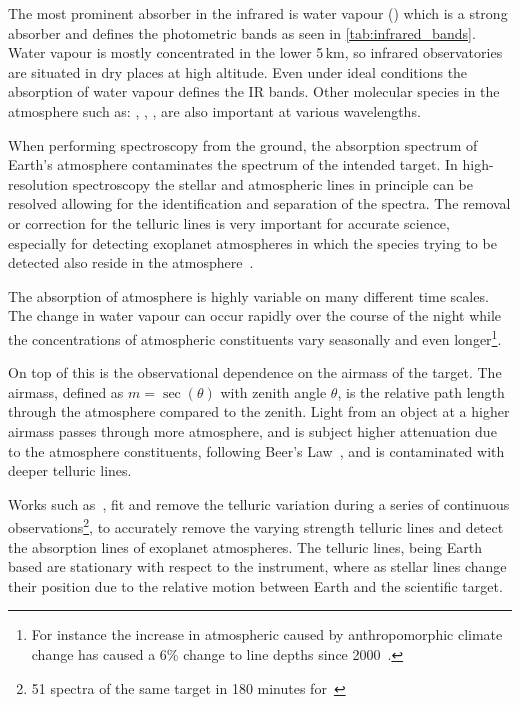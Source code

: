 

The most prominent absorber in the infrared is water vapour () which is a strong absorber and defines the photometric bands as seen in \cref{tab:infrared_bands}.
Water vapour is mostly concentrated in the lower 5\,\si{\kilo\metre}, so infrared observatories are situated in dry places at high altitude.
Even under ideal conditions the absorption of water vapour defines the IR bands.
Other molecular species in the atmosphere such as: , , , are also important at various wavelengths.

When performing spectroscopy from the ground, the absorption spectrum of Earth's atmosphere contaminates the spectrum of the intended target.
In high-resolution spectroscopy the stellar and atmospheric lines in principle can be resolved allowing for the identification and separation of the spectra.
The removal or correction for the telluric lines is very important for accurate science, especially for detecting exoplanet atmospheres in which the species trying to be detected also reside in the atmosphere~\citep{snellen_orbital_2010, brogi_carbon_2014, dekok_detection_2013}.

The absorption of atmosphere is highly variable on many different time scales.
The change in water vapour can occur rapidly over the course of the night while the concentrations of atmospheric constituents vary seasonally and even longer\footnote{For instance the increase in atmospheric  caused by anthropomorphic climate change has caused a 6\% change to  line depths since 2000~\citep{smette_molecfit_2015}.}.

On top of this is the observational dependence on the airmass of the target.
The airmass, defined as \(m = \sec{(\theta)}\) with zenith angle \(\theta\), is the relative path length through the atmosphere compared to the zenith.
Light from an object at a higher airmass passes through more atmosphere, and is subject higher attenuation due to the atmosphere constituents, following Beer's Law~\citep{beer_bestimmung_1852}, and is contaminated with deeper telluric lines.

Works such as~\citet{snellen_orbital_2010}, fit and remove the telluric variation during a series of continuous observations\footnote{51 spectra of the same target in 180 minutes for~\citet{snellen_orbital_2010}}, to accurately remove the varying strength telluric lines and detect the absorption lines of exoplanet atmospheres.
The telluric lines, being Earth based are stationary with respect to the instrument, where as stellar lines change their position due to the relative motion between Earth and the scientific target.
